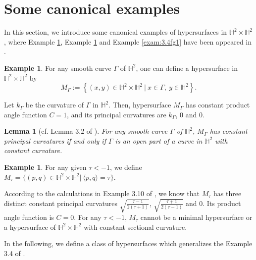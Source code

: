 \documentclass[reqno]{amsart}%
\newtheorem{lemma}[theorem]{Lemma}
\theoremstyle{definition}
\newtheorem{example}[theorem]{Example}
\numberwithin{equation}{section}
\begin{document}
\section{Some canonical examples}\label{sect:3}
%


In this section, we introduce some canonical examples of hypersurfaces in
$\mathbb{H}^2\times\mathbb{H}^2$, where Example \ref{exam:3.1f1f2}, Example \ref{exam:3.8f1f2}
and Example \ref{exam:3.4fg1} have been appeared in \cite{GMY}.
%
\begin{example}\label{exam:3.1f1f2}
For any smooth curve $\Gamma$ of $\mathbb{H}^2$, one can define a hypersurface
in $\mathbb{H}^2\times\mathbb{H}^2$ by
$$
M_\Gamma:=\left\{(x,y)\in \mathbb{H}^2\times\mathbb{H}^2
~|~x\in \Gamma,\ y\in\mathbb{H}^2\right\}.
$$
\end{example}

Let $k_{\Gamma}$ be the curvature of $\Gamma$ in $\mathbb{H}^2$.
Then, hypersurface $M_\Gamma$ has constant product angle function $C=1$, and its principal curvatures are $k_{\Gamma}$, $0$ and $0$.

\begin{lemma}[cf. Lemma 3.2 of \cite{GMY}]\label{lemma:3.1ff1}
For any smooth curve $\Gamma$ of $\mathbb{H}^2$, $M_\Gamma$ has constant principal curvatures
if and only if $\Gamma$ is an open part of a curve in $\mathbb{H}^2$ with constant curvature.
\end{lemma}


\begin{example}\label{exam:3.8f1f2}
For any given $\tau<-1$, we define $M_\tau=\{(p,q)\in
\mathbb{H}^2\times\mathbb{H}^2|\ \langle p,q\rangle=\tau\}$.
\end{example}


According to the calculations in Example 3.10 of \cite{GMY}, we know that
$M_\tau$ has three distinct constant principal curvatures
$\sqrt{\tfrac{\tau-1}{2(\tau+1)}}$, $\sqrt{\tfrac{\tau+1}{2(\tau-1)}}$ and $0$.
Its product angle function is $C=0$.
For any $\tau<-1$, $M_\tau$ cannot be a minimal hypersurface or a hypersurface of $\mathbb{H}^2\times\mathbb{H}^2$ with constant sectional curvature.


In the following, we define a class of hypersurfaces which generalizes the Example 3.4 of \cite{GMY}.
\end{document}
